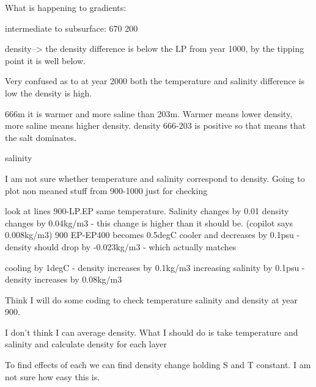 What is happening to gradients:

intermediate to subsurface:  670 200

density--> the density difference is below the LP from year 1000, by the tipping point it is well below.
 
Very confused as to at year 2000 both the temperature and salinity difference is low the density is high.


666m it is warmer and more saline than 203m.  Warmer means lower density, more saline means higher density.
density 666-203 is positive so that means that the salt dominates.

salinity



I am not sure whether temperature and salinity correspond to density.  Going to plot non meaned stuff from 900-1000 just for checking

look at lines
900-LP.EP same temperature.  Salinity changes by 0.01 density changes by 0.04kg/m3 - this change is higher than it should be. (copilot says 0.008kg/m3)
900 EP-EP400 becomes 0.5degC cooler and decreases by 0.1psu - density should drop by -0.023kg/m3 - which actually matches

cooling by 1degC - density increases by 0.1kg/m3
increasing salinity by 0.1psu - density increases by 0.08kg/m3



Think I will do some coding to check temperature salinity and density at year 900.

I don't think I can average density.
What I should do is take temperature and salinity and calculate density for each layer

To find effects of each we can find density change holding S and T constant.  I am not sure how easy this is.
